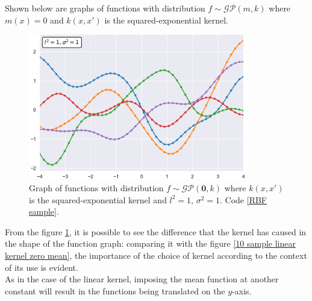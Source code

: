 Shown below are graphs of functions with distribution $f\sim \mathcal{GP}(m,k)$ where $m(x)=0$ and $k(x,x')$ is the squared-exponential kernel.


\begin{figure}[h]
    \centering
    \includegraphics[width=0.85\textwidth]{images/Gaussian process/RBFSample.pdf}
    \caption{Graph of functions with distribution $f\sim \mathcal{GP}(\bm{0},k)$ where $k(x,x')$ is the squared-exponential kernel and $l^2=1$, $\sigma^2=1$. Code \ref{RBF sample}.}
    \label{10 sample exponential kerne zero mean}
\end{figure}

From the figure \ref{10 sample exponential kerne zero mean}, it is possible to see the difference that the kernel has caused in the shape of the function graph: comparing it with the figure \ref{10 sample linear kernel zero mean}, the importance of the choice of kernel according to the context of its use is evident.\\
As in the case of the linear kernel, imposing the mean function at another constant will result in the functions being translated on the $y$-axis.


\newpage 



